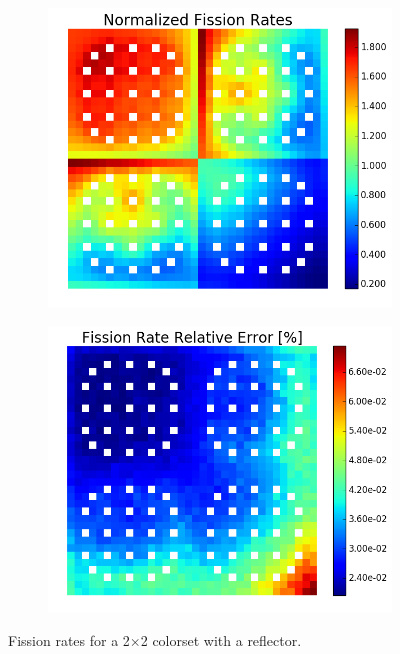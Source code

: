\begin{figure}[h!]
\centering
\begin{subfigure}{0.44\textwidth}
  \centering
  \includegraphics[width=\linewidth]{figures/benchmarks/fission-rates/fiss-mean-reflector}
  \caption{}
  \label{fig:chap7-fiss-rate-conv}
\end{subfigure}%
\begin{subfigure}{0.44\textwidth}
  \centering
  \includegraphics[width=\linewidth]{figures/benchmarks/fission-rates/fiss-rel-err-reflector}
  \caption{}
  \label{fig:chap7-fiss-rate-conv}
\end{subfigure}%
\caption[Fission rates for a 2$\times$2 colorset with a reflector]{Fission rates for a 2$\times$2 colorset with a reflector.}
\label{fig:chap7-fiss-rates-reflector}
\end{figure}

